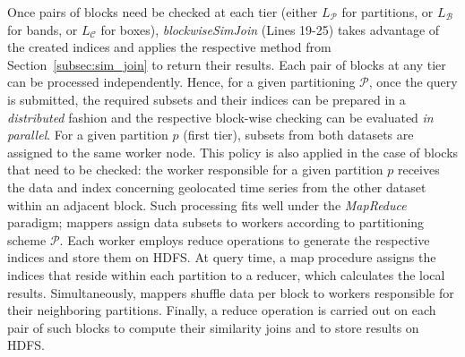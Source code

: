 Once pairs of blocks need be checked at each tier (either $L_{\mathcal{P}}$ for partitions, or $L_{\mathcal{B}}$ for bands, or $L_{\mathcal{C}}$ for boxes), {\em blockwiseSimJoin} (Lines 19-25) takes advantage of the created indices and applies the respective method from Section~\ref{subsec:sim_join} to return their results. Each pair of blocks at any tier can be processed independently. Hence, for a given partitioning $\mathcal{P}$, once the query is submitted, the required subsets and their indices can be prepared in a {\em distributed} fashion and the respective block-wise checking can be evaluated {\em in parallel}. For a given partition $p$ (first tier), subsets from both datasets are assigned to the same worker node. This policy is also applied in the case of blocks that need to be checked: the worker responsible for a given partition $p$ receives the data and index concerning geolocated time series from the other dataset within an adjacent block. Such processing fits well under the {\em MapReduce} paradigm; mappers assign data subsets to workers according to partitioning scheme $\mathcal{P}$. Each worker employs reduce operations to generate the respective indices and store them on HDFS. At query time, a map procedure assigns the indices that reside within each partition to a reducer, which calculates the local results. Simultaneously, mappers shuffle data per block to workers responsible for their neighboring partitions. Finally, a reduce operation is carried out on each pair of such blocks to compute their similarity joins and to store results on HDFS.

